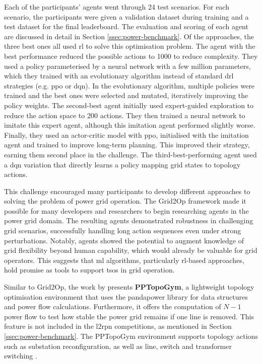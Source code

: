 Each of the participants' agents went through 24 test scenarios. For each scenario, the participants were given a validation dataset during training and a test dataset for the final leaderboard. The evaluation and scoring of each agent are discussed in detail in Section \ref{ssec:power-benchmark}. 
Of the approaches, the three best ones all used \ac{rl} to solve this optimisation problem. 
The agent with the best performance reduced the possible actions to 1000 to reduce complexity. They used a policy parameterised by a neural network with a few million parameters, which they trained with an evolutionary algorithm instead of standard \ac{drl} strategies (e.g. \ac{ppo} or \ac{dqn}). In the evolutionary algorithm, multiple policies were trained and the best ones were selected and mutated, iteratively improving the policy weights. 
The second-best agent initially used expert-guided exploration to reduce the action space to 200 actions. They then trained a neural network to imitate this expert agent, although this imitation agent performed slightly worse. Finally, they used an actor-critic model with \ac{ppo}, initialised with the imitation agent and trained to improve long-term planning. This improved their strategy, earning them second place in the challenge. The third-best-performing agent used a \ac{dqn} variation that directly learns a policy mapping grid states to topology actions.

This challenge encouraged many participants to develop different approaches to solving the problem of power grid operation. The Grid2Op framework made it possible for many developers and researchers to begin researching agents in the power grid domain. The resulting agents demonstrated robustness in challenging grid scenarios, successfully handling long action sequences even under strong perturbations. Notably, agents showed the potential to augment knowledge of grid flexibility beyond human capability, which would already be valuable for grid operators. This suggests that \ac{ml} algorithms, particularly \ac{rl}-based approaches, hold promise as tools to support \acp{tso} in grid operation.

Similar to Grid2Op, the work by \citet{pptopogym} presents \textbf{PPTopoGym}, a lightweight topology optimisation environment that uses the pandapower library for data structures and power flow calculations. Furthermore, it offers the computation of $N-1$ power flow to test how stable the power grid remains if one line is removed. This feature is not included in the \ac{l2rpn} competitions, as mentioned in Section \ref{ssec:power-benchmark}. The PPTopoGym environment supports topology actions such as substation reconfiguration, as well as line, switch and transformer switching \cite{pptopogym}.

